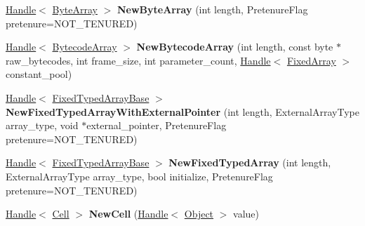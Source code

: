 \begin{DoxyCompactItemize}
\item 
\hyperlink{classv8_1_1internal_1_1_handle}{Handle}$<$ \hyperlink{classv8_1_1internal_1_1_byte_array}{Byte\+Array} $>$ {\bfseries New\+Byte\+Array} (int length, Pretenure\+Flag pretenure=N\+O\+T\+\_\+\+T\+E\+N\+U\+R\+ED)\hypertarget{classv8_1_1internal_1_1_factory_a015cfffd3646432f2564a415c4834218}{}\label{classv8_1_1internal_1_1_factory_a015cfffd3646432f2564a415c4834218}

\item 
\hyperlink{classv8_1_1internal_1_1_handle}{Handle}$<$ \hyperlink{classv8_1_1internal_1_1_bytecode_array}{Bytecode\+Array} $>$ {\bfseries New\+Bytecode\+Array} (int length, const byte $\ast$raw\+\_\+bytecodes, int frame\+\_\+size, int parameter\+\_\+count, \hyperlink{classv8_1_1internal_1_1_handle}{Handle}$<$ \hyperlink{classv8_1_1internal_1_1_fixed_array}{Fixed\+Array} $>$ constant\+\_\+pool)\hypertarget{classv8_1_1internal_1_1_factory_ad5646803ce9c460f62c27d468c5fbc51}{}\label{classv8_1_1internal_1_1_factory_ad5646803ce9c460f62c27d468c5fbc51}

\item 
\hyperlink{classv8_1_1internal_1_1_handle}{Handle}$<$ \hyperlink{classv8_1_1internal_1_1_fixed_typed_array_base}{Fixed\+Typed\+Array\+Base} $>$ {\bfseries New\+Fixed\+Typed\+Array\+With\+External\+Pointer} (int length, External\+Array\+Type array\+\_\+type, void $\ast$external\+\_\+pointer, Pretenure\+Flag pretenure=N\+O\+T\+\_\+\+T\+E\+N\+U\+R\+ED)\hypertarget{classv8_1_1internal_1_1_factory_a2ddca8c1f844d6d7d6c74df8c0adc9a2}{}\label{classv8_1_1internal_1_1_factory_a2ddca8c1f844d6d7d6c74df8c0adc9a2}

\item 
\hyperlink{classv8_1_1internal_1_1_handle}{Handle}$<$ \hyperlink{classv8_1_1internal_1_1_fixed_typed_array_base}{Fixed\+Typed\+Array\+Base} $>$ {\bfseries New\+Fixed\+Typed\+Array} (int length, External\+Array\+Type array\+\_\+type, bool initialize, Pretenure\+Flag pretenure=N\+O\+T\+\_\+\+T\+E\+N\+U\+R\+ED)\hypertarget{classv8_1_1internal_1_1_factory_a8ce8e748565f42dcd2189f3f00363d9d}{}\label{classv8_1_1internal_1_1_factory_a8ce8e748565f42dcd2189f3f00363d9d}

\item 
\hyperlink{classv8_1_1internal_1_1_handle}{Handle}$<$ \hyperlink{classv8_1_1internal_1_1_cell}{Cell} $>$ {\bfseries New\+Cell} (\hyperlink{classv8_1_1internal_1_1_handle}{Handle}$<$ \hyperlink{classv8_1_1internal_1_1_object}{Object} $>$ value)\hypertarget{classv8_1_1internal_1_1_factory_a9bfdb7b0d208bd2f586c940031585db3}{}\label{classv8_1_1internal_1_1_factory_a9bfdb7b0d208bd2f586c940031585db3}


\end{DoxyCompactItemize}
